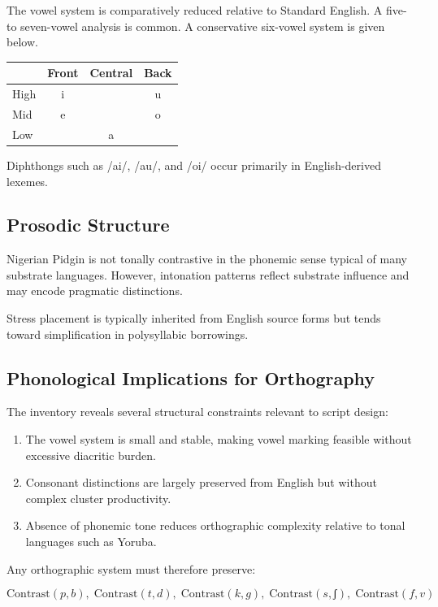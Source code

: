 \documentclass[12pt]{article}
\begin{document}
The vowel system is comparatively reduced relative to Standard English. A five- to seven-vowel analysis is common. A conservative six-vowel system is given below.

\begin{center}
\begin{tabular}{lccc}
 & Front & Central & Back \\ \hline
High & i &  & u \\
Mid & e &  & o \\
Low &  & a &  \\
\end{tabular}
\end{center}

Diphthongs such as /ai/, /au/, and /oi/ occur primarily in English-derived lexemes.

\subsection{Prosodic Structure}

Nigerian Pidgin is not tonally contrastive in the phonemic sense typical of many substrate languages. However, intonation patterns reflect substrate influence and may encode pragmatic distinctions.

Stress placement is typically inherited from English source forms but tends toward simplification in polysyllabic borrowings.

\subsection{Phonological Implications for Orthography}

The inventory reveals several structural constraints relevant to script design:

\begin{enumerate}
\item The vowel system is small and stable, making vowel marking feasible without excessive diacritic burden.
\item Consonant distinctions are largely preserved from English but without complex cluster productivity.
\item Absence of phonemic tone reduces orthographic complexity relative to tonal languages such as Yoruba.
\end{enumerate}

Any orthographic system must therefore preserve:

\[
\text{Contrast}(p,b),\;
\text{Contrast}(t,d),\;
\text{Contrast}(k,g),\;
\text{Contrast}(s,ʃ),\;
\text{Contrast}(f,v)
\]
\end{document}
